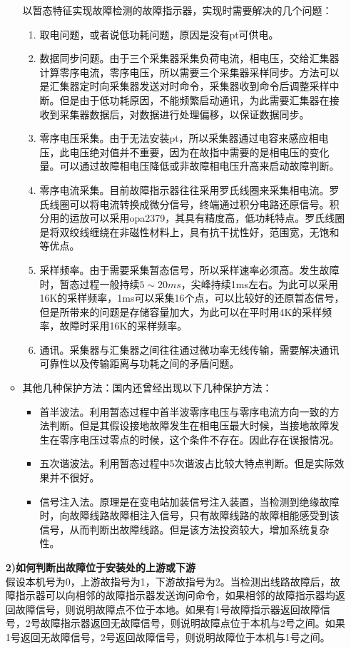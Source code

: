 \documentclass{article}
\begin{document}
\begin{CJK}{UTF8}{gbsn}
\begin{enumerate}
\begin{itemize}
				以暂态特征实现故障检测的故障指示器，实现时需要解决的几个问题：
				\begin{enumerate}
				\item  取电问题，或者说低功耗问题，原因是没有pt可供电。
				\item  数据同步问题。由于三个采集器采集负荷电流，相电压，交给汇集器计算零序电流，零序电压，所以需要三个采集器采样同步。方法可以是汇集器定时向采集器发送对时命令，采集器收到命令后调整采样中断。但是由于低功耗原因，不能频繁启动通讯，为此需要汇集器在接收到采集器数据后，对数据进行处理偏移，以保证数据同步。
				\item 零序电压采集。由于无法安装pt，所以采集器通过电容来感应相电压，此电压绝对值并不重要，因为在故指中需要的是相电压的变化量。可以通过故障相电压降低或非故障相电压升高来启动故障判断。
				\item 零序电流采集。目前故障指示器往往采用罗氏线圈来采集相电流。罗氏线圈可以将电流转换成微分信号，终端通过积分电路还原信号。积分用的运放可以采用opa2379，其具有精度高，低功耗特点。罗氏线圈是将双绞线缠绕在非磁性材料上，具有抗干扰性好，范围宽，无饱和等优点。
				\item 采样频率。由于需要采集暂态信号，所以采样速率必须高。发生故障时，暂态过程一般持续$5\sim 20ms$，尖峰持续1ms左右。为此可以采用16K的采样频率，1ms可以采集16个点，可以比较好的还原暂态信号，但是所带来的问题是存储容量加大，为此可以在平时用4K的采样频率，故障时采用16K的采样频率。
				\item  通讯。采集器与汇集器之间往往通过微功率无线传输，需要解决通讯可靠性以及传输距离与功耗之间的矛盾问题。
			\end{enumerate}
		\item 其他几种保护方法：国内还曾经出现以下几种保护方法：\cite{p2}
			\begin{itemize}
					\item 首半波法。利用暂态过程中首半波零序电压与零序电流方向一致的方法判断。但是其假设接地故障发生在相电压最大时候，当接地故障发生在零序电压过零点的时候，这个条件不存在。因此存在误报情况。
					\item 五次谐波法。利用暂态过程中5次谐波占比较大特点判断。但是实际效果并不很好。
					\item 信号注入法。原理是在变电站加装信号注入装置，当检测到绝缘故障时，向故障线路故障相注入信号，只有故障线路的故障相能感受到该信号，从而判断出故障线路。但是该方法投资较大，增加系统复杂性。
			\end{itemize}
	\end{itemize}
	\textbf{2)如何判断出故障位于安装处的上游或下游}\\
			假设本机号为0，上游故指号为1，下游故指号为2。当检测出线路故障后，故障指示器可以向相邻的故障指示器发送询问命令，如果相邻的故障指示器均返回故障信号，则说明故障点不位于本地。如果有1号故障指示器返回故障信号，2号故障指示器返回无故障信号，则说明故障点位于本机与2号之间。如果1号返回无故障信号，2号返回故障信号，则说明故障位于本机与1号之间。\\

\end{enumerate}
\end{CJK}
\end{document}
